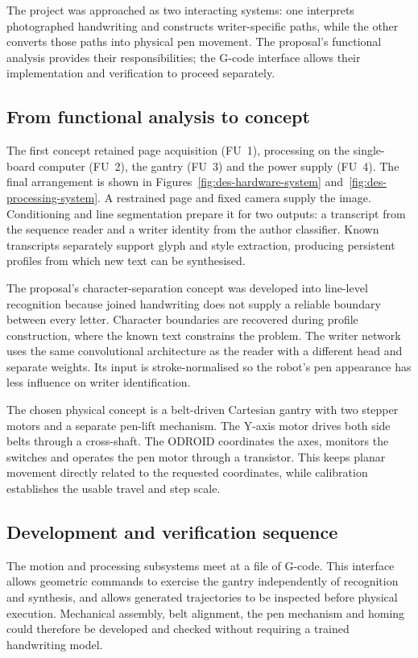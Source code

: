 \label{sec:approach}
The project was approached as two interacting systems: one interprets photographed handwriting and constructs writer-specific paths, while the other converts those paths into physical pen movement. The proposal's functional analysis provides their responsibilities; the G-code interface allows their implementation and verification to proceed separately.

\subsection{From functional analysis to concept}
\label{sec:app-concept}
The first concept retained page acquisition (FU~1), processing on the single-board computer (FU~2), the gantry (FU~3) and the power supply (FU~4). The final arrangement is shown in Figures~\ref{fig:des-hardware-system} and~\ref{fig:des-processing-system}. A restrained page and fixed camera supply the image. Conditioning and line segmentation prepare it for two outputs: a transcript from the sequence reader and a writer identity from the author classifier. Known transcripts separately support glyph and style extraction, producing persistent profiles from which new text can be synthesised.

The proposal's character-separation concept was developed into line-level recognition because joined handwriting does not supply a reliable boundary between every letter. Character boundaries are recovered during profile construction, where the known text constrains the problem. The writer network uses the same convolutional architecture as the reader with a different head and separate weights. Its input is stroke-normalised so the robot's pen appearance has less influence on writer identification.

The chosen physical concept is a belt-driven Cartesian gantry with two stepper motors and a separate pen-lift mechanism. The Y-axis motor drives both side belts through a cross-shaft. The ODROID coordinates the axes, monitors the switches and operates the pen motor through a transistor. This keeps planar movement directly related to the requested coordinates, while calibration establishes the usable travel and step scale.

\subsection{Development and verification sequence}
\label{sec:app-order}
The motion and processing subsystems meet at a file of G-code. This interface allows geometric commands to exercise the gantry independently of recognition and synthesis, and allows generated trajectories to be inspected before physical execution. Mechanical assembly, belt alignment, the pen mechanism and homing could therefore be developed and checked without requiring a trained handwriting model.


